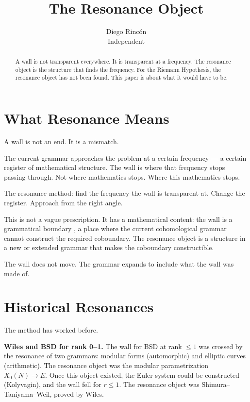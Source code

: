 \documentclass[12pt]{article}
\title{The Resonance Object}
\author{Diego Rinc\'on\\
\small Independent}
\date{}
\theoremstyle{definition}
\theoremstyle{remark}
\begin{document}
\maketitle

\begin{abstract}
A wall is not transparent everywhere.
It is transparent at a frequency.
The resonance object is the structure that finds the frequency.
For the Riemann Hypothesis, the resonance object has not been found.
This paper is about what it would have to be.
\end{abstract}

\section{What Resonance Means}

A wall is not an end.
It is a mismatch.

The current grammar approaches the problem at a certain frequency ---
a certain register of mathematical structure.
The wall is where that frequency stops passing through.
Not where mathematics stops.
Where this mathematics stops.

The resonance method: find the frequency the wall is transparent at.
Change the register. Approach from the right angle.

This is not a vague prescription.
It has a mathematical content:
the wall is a grammatical boundary \cite{grammar},
a place where the current cohomological grammar
cannot construct the required coboundary.
The resonance object is a structure in a new or extended grammar
that makes the coboundary constructible.

The wall does not move.
The grammar expands to include what the wall was made of.

\section{Historical Resonances}

The method has worked before.

\textbf{Wiles and BSD for rank 0--1.}
The wall for BSD at rank $\leq 1$ was crossed
by the resonance of two grammars:
modular forms (automorphic) and elliptic curves (arithmetic).
The resonance object was the modular parametrization $X_0(N) \to E$.
Once this object existed,
the Euler system could be constructed (Kolyvagin),
and the wall fell for $r \leq 1$.
The resonance object was Shimura--Taniyama--Weil,
proved by Wiles.
\end{document}
